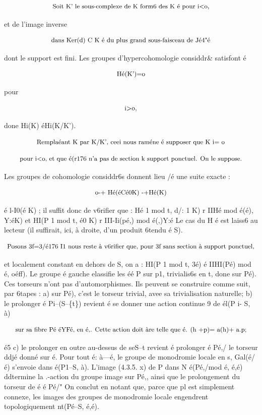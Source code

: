 \documentclass[11pt]{article}
\theoremstyle{remark}
\begin{document}
\[\text{\small Soit K' le sous-complexe de K form6 des K é pour i<o,}\]

et de l'image inverse

\[\text{\small dans Ker(d) C K é du plus grand sous-faisceau de Jé4"é}\]

dont le support est fini. Les groupes d'hypercohomologie considdr\& satisfont é

\[\text{\small Hé(K')=o}\]

pour

\[\text{\small i>o,}\]

done Hi(K) éHi(K/K').

\[\text{\small Remplaéant K par K/K', ceei nous raméne é supposer que K i= o}\]

\[\text{\small pour i<o, et que é(r176 n'a pas de section k support ponctuel. On le suppose.}\]

Les groupes de cohomologie considdr6s donnent lieu /é une suite exacte :

\[\text{\small o-+ Hé(éCé0K) -+Hé(K)}\]

é l-I0(é K) ; il suffit donc de v6rifier que : Hé 1 mod t, d/: 1 K) r IIHé mod é(é), Y:éK) et HI(P 1 mod t, é0 K) r III-Ii(pé,) mod é(,)Y:é Le cas du H é est laiss6 au lecteur (il suffirait, ici, à droite, d'un produit 6tendu é S).

\[\text{\small Posons 3f=3/é176 I1 nous reste à v6rifier que, pour 3f sans section à support ponctuel,}\]

et localement constant en dehors de S, on a : HI(P 1 mod t, 3é) é IIHI(Pé) mod é, oéff). Le groupe é gauche elassifie les éé P sur p1, trivialis6s en t, done sur Pé). Ces torseurs n'ont pas d'automorphismes. Ils peuvent se construire comme suit, par 6tapes : a) sur Pé), c'est le torseur trivial, avee sa trivialisation naturelle; b) le prolonger é Pi--(S--\{t\}) revient é se donner une action continue  9 de él(P i- S, à)

\[\text{\small sur sa fibre Pé éYFé, en é,. Cette action doit àre telle que é. (h +p)= a(h)+ a.p;}\]

é5 c) le prolonger en outre au-dessus de seS--t revient é prolonger é Pé,/ le torseur ddjé donné sur é. Pour tout é: à---é, le groupe de monodromie locale en s, Gal(é/é) s'envoie dans é(P1--S, à). L'image (4.3.5. x) de P dans N é(Pé,/mod é, é,é) ddtermine la .-action du groupe image sur Pé,, ainsi que le prolongement du torseur de é é Pé/" On conclut en notant que, parce que pl est simplement connexe, les images des groupes de monodromie locale engendrent topologiquement nt(Pé--S, é,é).
\end{document}

